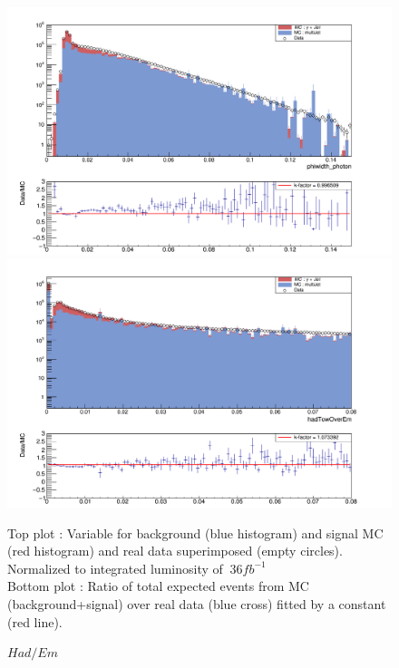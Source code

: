 \documentclass[11pt,a4paper]{report}
\theoremstyle{break}
\begin{document}
\begin{appendix}
\begin{figure}[h!]
\begin{minipage}[b]{0.5\linewidth}
    \includegraphics[width=1\textwidth]{phiwidth_photon}
    \caption{$\phi_{width}$}
    \end{minipage}
    \begin{minipage}[b]{0.5\linewidth}
    \includegraphics[width=1\textwidth]{hadTowOverEm}
    \caption{$Had/Em$}
    \end{minipage}
Top plot : Variable for background (blue histogram) and signal MC (red histogram) and real data superimposed (empty circles). Normalized to integrated luminosity of $~36fb^{-1}$\\Bottom plot : Ratio of total expected events from MC (background+signal) over real data (blue cross) fitted by a constant (red line).
\end{figure}



\end{appendix}
\end{document}

